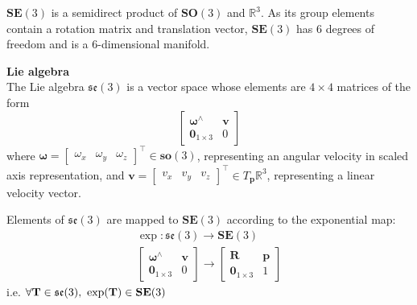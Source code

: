 		$\textbf{SE}(3)$ is a semidirect product of $\textbf{SO}(3)$ and $ \mathbb{R}^3$. As its group elements contain a rotation matrix and translation vector, $\textbf{SE}(3)$ has 6 degrees of freedom and is a 6-dimensional manifold.
			
		\textbf{Lie algebra}\\
		The Lie algebra $\mathfrak{se}(3)$ is a vector space whose elements are $4 \times 4$ matrices of the form
		\begin{equation}
			\begin{bmatrix}
				  \bm{\omega}^{\wedge}	&  \mathbf{v}\\
				  \textbf{0}_{1 \times 3} & 0						  
			\end{bmatrix}
		\end{equation}
		where $\bm{\omega} =
		\begin{bmatrix}
			\omega_x & \omega_y & \omega_z				
		\end{bmatrix}
		^\top \in \mathbf{so}(3)$, representing an angular velocity in scaled axis representation, and
		$\mathbf{v} = 
		\begin{bmatrix}
			v_x & v_y & v_z				
		\end{bmatrix}
		^\top \in T_{\mathbf{p}}\mathbb{R}^3$, representing a linear velocity vector.
		
		Elements of $\mathfrak{se}(3)$ are mapped to $\textbf{SE}(3)$ according to the exponential map:
			\begin{equation}
				\begin{split}
					\exp: \mathfrak{se}(3) \rightarrow \mathbf{SE}(3)\\
					\begin{bmatrix}
						  \bm{\omega}^{\wedge}	&  \mathbf{v}\\
						  \textbf{0}_{1 \times 3} & 0						  
					\end{bmatrix}
					\rightarrow 
					\begin{bmatrix}
						  \mathbf{R}	&	\mathbf{p} \\
						  \textbf{0}_{1 \times 3}		& 	1 
					\end{bmatrix}
				\end{split}		
			\end{equation}		
			i.e. $\forall \mathbf{T} \in \mathfrak{se}(3) \textnormal{, } \exp(\mathbf{T}) \in  \mathbf{SE}(3)$
			
